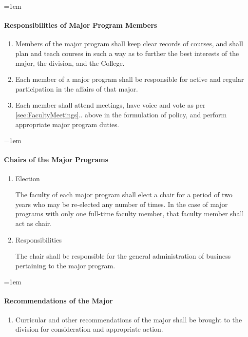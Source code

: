 \documentclass{manual}
\let\oldparagraph\paragraph
\renewcommand\paragraph{\leftskip=1em\oldparagraph}
\newcommand{\itemLevelA}{\alph*.}
\newcommand{\itemRefA}{\alph*}
\begin{document}
\paragraph{Responsibilities of Major Program Members}
\begin{enumerate}[label=\itemLevelA,ref=\itemRefA]
\item Members of the major program shall keep clear records of courses, and shall plan and teach courses in such a way as to further the best interests of the major, the division, and the College.
\item Each member of a major program shall be responsible for active and regular participation in the affairs of that major.
\item Each member shall attend meetings, have voice and vote as per \cref{sec:FacultyMeetings}.. above in the formulation of policy, and perform appropriate major program duties.
\end{enumerate}

\paragraph{Chairs of the Major Programs}
\begin{enumerate}[label=\itemLevelA,ref=\itemRefA]
\item Election

The faculty of each major program shall elect a chair for a period of two years who may be re-elected any number of times. In the case of major programs with only one full-time faculty member, that faculty member shall act as chair.
\item Responsibilities

The chair shall be responsible for the general administration of business pertaining to the major program.
\end{enumerate}

\paragraph{Recommendations of the Major}
\begin{enumerate}[label=\itemLevelA,ref=\itemRefA]
\item Curricular and other recommendations of the major shall be brought to the division for consideration and appropriate action.
\end{enumerate}
\end{document}
